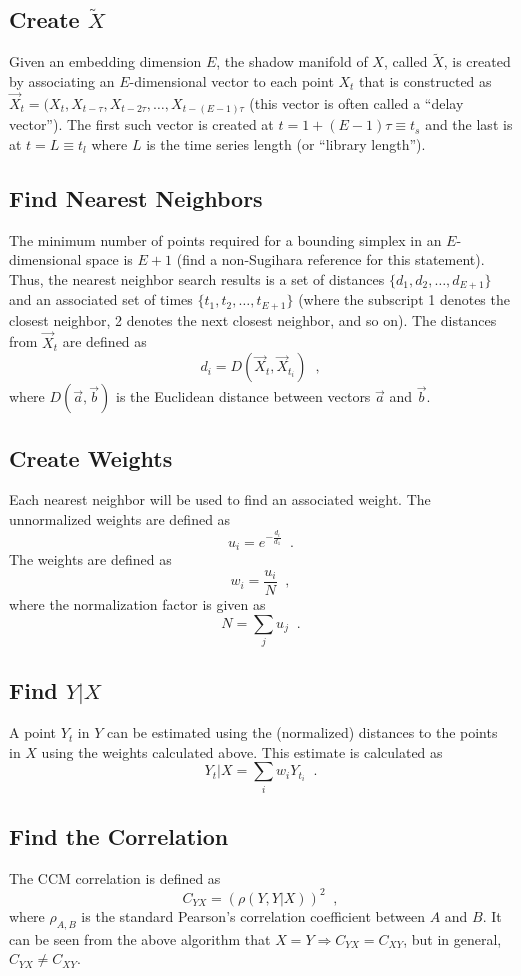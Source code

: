 \documentclass[a4paper,11pt]{article}
\begin{document}
\subsection{Create $\tilde{X}$}
Given an embedding dimension $E$, the shadow manifold of $X$, called $\tilde{X}$, is created by associating an $E$-dimensional vector to each point $X_t$ that is constructed as $\vec{X}_t=(X_t,X_{t-\tau},X_{t-2\tau},\ldots,X_{t-(E-1)\tau}$ (this vector is often called a ``delay vector'').  The first such vector is created at $t=1+(E-1)\tau\equiv t_s$ and the last is at $t=L\equiv t_l$ where $L$ is the time series length (or ``library length'').  

\subsection{Find Nearest Neighbors}
The minimum number of points required for a bounding simplex in an $E$-dimensional space is $E+1$ (find a non-Sugihara reference for this statement).  Thus, the nearest neighbor search results is a set of distances $\{d_1,d_2,\ldots,d_{E+1}\}$ and an associated set of times $\{t_1,t_2,\ldots,t_{E+1}\}$ (where the subscript 1 denotes the closest neighbor, 2 denotes the next closest neighbor, and so on).  The distances from $\vec{X}_t$ are defined as
$$
d_i = D\left(\vec{X}_t,\vec{X}_{t_i}\right)\;\;,
$$
where $D(\vec{a},\vec{b})$ is the Euclidean distance between vectors $\vec{a}$ and $\vec{b}$.

\subsection{Create Weights}
Each nearest neighbor will be used to find an associated weight.  The unnormalized weights are defined as
$$
u_i = e^{-\frac{d_i}{d_1}}\;\;.
$$
The weights are defined as
$$
w_i = \frac{u_i}{N}\;\;,
$$
where the normalization factor is given as
$$
N = \sum_j u_j\;\;.
$$

\subsection{Find $Y|X$}
A point $Y_t$ in $Y$ can be estimated using the (normalized) distances to the points in $X$ using the weights calculated above.  This estimate is calculated as
$$
Y_t|X = \sum_i w_i Y_{t_i}\;\;.
$$

\subsection{Find the Correlation}
The CCM correlation is defined as 
$$
C_{YX} = \left(\rho\left(Y,Y|X\right)\right)^2\;\;,
$$
where $\rho_{A,B}$ is the standard Pearson's correlation coefficient between $A$ and $B$.  It can be seen from the above algorithm that $X=Y \Rightarrow C_{YX}=C_{XY}$, but in general, $C_{YX}\neq C_{XY}$.  




\end{document}
